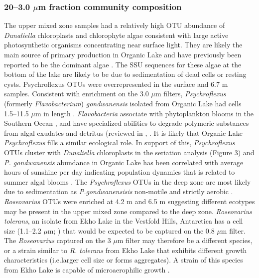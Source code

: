 {{\subsubsection{20--3.0 $\mu$m fraction community composition}
The upper mixed zone samples had a relatively high \ac{OTU} abundance of \emph{Dunaliella} chloroplasts and chlorophyte algae consistent with large active photosynthetic organisms concentrating near surface light. 
They are likely the main source of primary production in Organic Lake and have previously been reported to be the dominant algae \cite{Franzmann1987b}. 
The \ac{SSU} sequences for these algae at the bottom of the lake are likely to be due to sedimentation of dead cells or resting cysts.
Psychroflexus \acp{OTU} were overrepresented in the surface and 6.7 m samples. 
Consistent with enrichment on the 3.0 $\mu$m filters, \emph{Psychroflexus} (formerly \emph{Flavobacterium}) \emph{gondwanensis} \cite{Bowman1998} isolated from Organic Lake \cite{Franzmann1987b} had cells 1.5--11.5 $\mu$m in length \cite{Dobson1991}. 
\emph{Flavobacteria} associate with phytoplankton blooms in the Southern Ocean \cite{Abell2005a, Abell2005b, Williams2012b}, and have specialized abilities to degrade polymeric substances from algal exudates and detritus (reviewed in \citet{Kirchman2002}, \cite{Williams2012b}. 
It is likely that Organic Lake \emph{Psychroflexus} fills a similar ecological role. 
In support of this, \emph{Psychroflexus} \acp{OTU} cluster with \emph{Dunaliella} chloroplasts in the seriation analysis (Figure 3) and \emph{P. gondwanensis} abundance in Organic Lake has been correlated with average hours of sunshine per day indicating population dynamics that is related to summer algal blooms \cite{James1994}. 
The \emph{Psychroflexus} \acp{OTU} in the deep zone are most likely due to sedimentation as \emph{P.gondwanensisis} non-motile and strictly aerobic \cite{Dobson1991}.
\emph{Roseovarius} \acp{OTU} were enriched at 4.2 m and 6.5 m suggesting different ecotypes may be present in the upper mixed zone compared to the deep zone. 
\emph{Roseovarius tolerans}, an isolate from Ekho Lake in the Vestfold Hills, Antarctica has a cell size (1.1--2.2 $\mu$m; \cite{Labrenz1999}) that would be expected to be captured on the 0.8 $\mu$m filter. 
The \emph{Roseovarius} captured on the 3 $\mu$m filter may therefore be a different species, or a strain similar to \emph{R. tolerans} from Ekho Lake that exhibits different growth characteristics (i.e.larger cell size or forms aggregates). 
A strain of this species from Ekho Lake is capable of microaerophilic growth \cite{Labrenz1999}. 
}}
